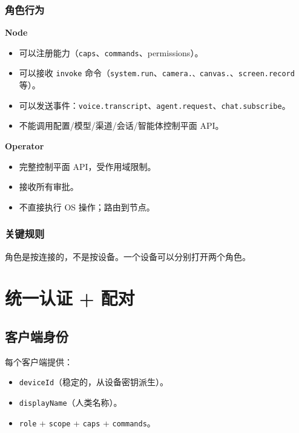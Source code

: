 \subsubsection{角色行为}


\textbf{Node}

\begin{itemize}
  \item 可以注册能力（\texttt{caps}、\texttt{commands}、permissions）。
  \item 可以接收 \texttt{invoke} 命令（\texttt{system.run}、\texttt{camera.\textit{}、\texttt{canvas.}}、\texttt{screen.record} 等）。
  \item 可以发送事件：\texttt{voice.transcript}、\texttt{agent.request}、\texttt{chat.subscribe}。
  \item 不能调用配置/模型/渠道/会话/智能体控制平面 API。
\end{itemize}


\textbf{Operator}

\begin{itemize}
  \item 完整控制平面 API，受作用域限制。
  \item 接收所有审批。
  \item 不直接执行 OS 操作；路由到节点。
\end{itemize}


\subsubsection{关键规则}


角色是按连接的，不是按设备。一个设备可以分别打开两个角色。

\hrulefill


\section{统一认证 + 配对}


\subsection{客户端身份}


每个客户端提供：

\begin{itemize}
  \item \texttt{deviceId}（稳定的，从设备密钥派生）。
  \item \texttt{displayName}（人类名称）。
  \item \texttt{role} + \texttt{scope} + \texttt{caps} + \texttt{commands}。
\end{itemize}


